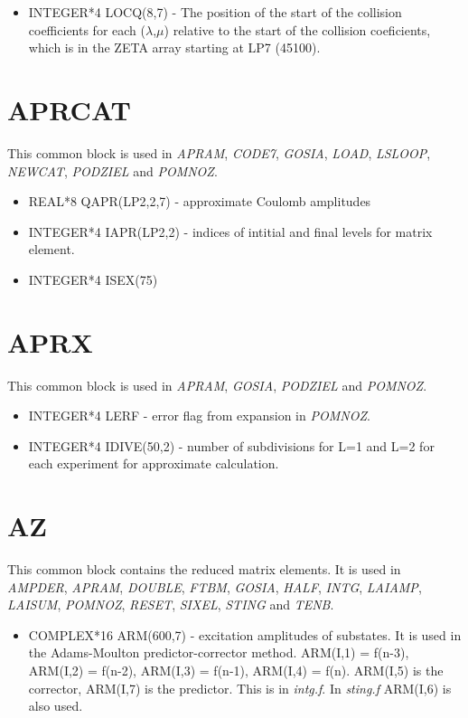 \begin{itemize}
\item INTEGER*4 LOCQ(8,7) - The position of the start of the collision
coefficients for each ($\lambda$,$\mu$) relative to the start of the
collision coeficients, which is in the ZETA array starting at LP7 (45100).
\end{itemize}

\section{APRCAT}

This common block is used in \emph{APRAM}, \emph{CODE7}, \emph{GOSIA}, \emph{
LOAD}, \emph{LSLOOP}, \emph{NEWCAT}, \emph{PODZIEL} and \emph{POMNOZ}.

\begin{itemize}
\item REAL*8 QAPR(LP2,2,7) - approximate Coulomb amplitudes
\item INTEGER*4 IAPR(LP2,2) - indices of intitial and final levels for
matrix element.
\item INTEGER*4 ISEX(75)
\end{itemize}

\section{APRX}

This common block is used in \emph{APRAM}, \emph{GOSIA}, \emph{PODZIEL} and
\emph{POMNOZ}.

\begin{itemize}
\item INTEGER*4 LERF - error flag from expansion in \emph{POMNOZ}.
\item INTEGER*4 IDIVE(50,2) - number of subdivisions for L=1 and L=2 for
each experiment for approximate calculation.
\end{itemize}

\section{AZ}

This common block contains the reduced matrix elements. It is used in \emph{
AMPDER}, \emph{APRAM}, \emph{DOUBLE}, \emph{FTBM}, \emph{GOSIA}, \emph{HALF},
\emph{INTG}, \emph{LAIAMP}, \emph{LAISUM}, \emph{POMNOZ}, \emph{RESET}, \emph{
SIXEL}, \emph{STING} and \emph{TENB}.

\begin{itemize}
\item COMPLEX*16 ARM(600,7) - excitation amplitudes of substates. It is used
in the Adams-Moulton predictor-corrector method. ARM(I,1) = f(n-3), ARM(I,2)
= f(n-2), ARM(I,3) = f(n-1), ARM(I,4) = f(n). ARM(I,5) is the corrector,
ARM(I,7) is the predictor. This is in \emph{intg.f}. In \emph{sting.f}
ARM(I,6) is also used.
\end{itemize}

